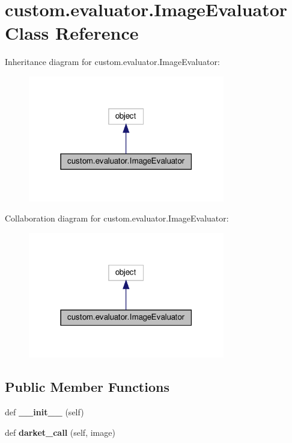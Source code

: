 \hypertarget{classcustom_1_1evaluator_1_1ImageEvaluator}{}\section{custom.\+evaluator.\+Image\+Evaluator Class Reference}
\label{classcustom_1_1evaluator_1_1ImageEvaluator}


Inheritance diagram for custom.\+evaluator.\+Image\+Evaluator\+:
\nopagebreak
\begin{figure}[H]
\begin{center}
\leavevmode
\includegraphics[width=243pt]{classcustom_1_1evaluator_1_1ImageEvaluator__inherit__graph}
\end{center}
\end{figure}


Collaboration diagram for custom.\+evaluator.\+Image\+Evaluator\+:
\nopagebreak
\begin{figure}[H]
\begin{center}
\leavevmode
\includegraphics[width=243pt]{classcustom_1_1evaluator_1_1ImageEvaluator__coll__graph}
\end{center}
\end{figure}
\subsection*{Public Member Functions}
\begin{DoxyCompactItemize}
\item 
\mbox{\label{classcustom_1_1evaluator_1_1ImageEvaluator_ab635bc5d6e51236b1e64b6eec9bfa405}} 
def {\bfseries \+\_\+\+\_\+init\+\_\+\+\_\+} (self)
\item 
\mbox{\label{classcustom_1_1evaluator_1_1ImageEvaluator_a45b8ac781323e706f30bdf46ac3ed1fd}} 
def {\bfseries darket\+\_\+call} (self, image)
\end{DoxyCompactItemize}
